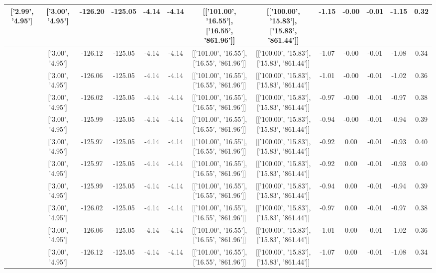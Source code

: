 \begin{table}[htbp]
\begin{adjustbox}{angle=90}
\begin{tabular}{|c|c|c|c|c|c|c|c|c|c|c|c|c|}
 ['2.99', '4.95'] & ['3.00', '4.95'] & -126.20 & -125.05 & -4.14 & -4.14 & [['101.00', '16.55'], ['16.55', '861.96']] & [['100.00', '15.83'], ['15.83', '861.44']] & -1.15 & -0.00 & -0.01 & -1.15 & 0.32\\ \hline
 ['2.99', '4.95'] & ['3.00', '4.95'] & -126.12 & -125.05 & -4.14 & -4.14 & [['101.00', '16.55'], ['16.55', '861.96']] & [['100.00', '15.83'], ['15.83', '861.44']] & -1.07 & -0.00 & -0.01 & -1.08 & 0.34\\ \hline
 ['3.00', '4.95'] & ['3.00', '4.95'] & -126.06 & -125.05 & -4.14 & -4.14 & [['101.00', '16.55'], ['16.55', '861.96']] & [['100.00', '15.83'], ['15.83', '861.44']] & -1.01 & -0.00 & -0.01 & -1.02 & 0.36\\ \hline
 ['3.00', '4.95'] & ['3.00', '4.95'] & -126.02 & -125.05 & -4.14 & -4.14 & [['101.00', '16.55'], ['16.55', '861.96']] & [['100.00', '15.83'], ['15.83', '861.44']] & -0.97 & -0.00 & -0.01 & -0.97 & 0.38\\ \hline
 ['3.00', '4.95'] & ['3.00', '4.95'] & -125.99 & -125.05 & -4.14 & -4.14 & [['101.00', '16.55'], ['16.55', '861.96']] & [['100.00', '15.83'], ['15.83', '861.44']] & -0.94 & -0.00 & -0.01 & -0.94 & 0.39\\ \hline
 ['3.00', '4.95'] & ['3.00', '4.95'] & -125.97 & -125.05 & -4.14 & -4.14 & [['101.00', '16.55'], ['16.55', '861.96']] & [['100.00', '15.83'], ['15.83', '861.44']] & -0.92 & 0.00 & -0.01 & -0.93 & 0.40\\ \hline
 ['3.00', '4.95'] & ['3.00', '4.95'] & -125.97 & -125.05 & -4.14 & -4.14 & [['101.00', '16.55'], ['16.55', '861.96']] & [['100.00', '15.83'], ['15.83', '861.44']] & -0.92 & 0.00 & -0.01 & -0.93 & 0.40\\ \hline
 ['3.00', '4.95'] & ['3.00', '4.95'] & -125.99 & -125.05 & -4.14 & -4.14 & [['101.00', '16.55'], ['16.55', '861.96']] & [['100.00', '15.83'], ['15.83', '861.44']] & -0.94 & 0.00 & -0.01 & -0.94 & 0.39\\ \hline
 ['3.00', '4.95'] & ['3.00', '4.95'] & -126.02 & -125.05 & -4.14 & -4.14 & [['101.00', '16.55'], ['16.55', '861.96']] & [['100.00', '15.83'], ['15.83', '861.44']] & -0.97 & 0.00 & -0.01 & -0.97 & 0.38\\ \hline
 ['3.00', '4.95'] & ['3.00', '4.95'] & -126.06 & -125.05 & -4.14 & -4.14 & [['101.00', '16.55'], ['16.55', '861.96']] & [['100.00', '15.83'], ['15.83', '861.44']] & -1.01 & 0.00 & -0.01 & -1.02 & 0.36\\ \hline
 ['3.01', '4.95'] & ['3.00', '4.95'] & -126.12 & -125.05 & -4.14 & -4.14 & [['101.00', '16.55'], ['16.55', '861.96']] & [['100.00', '15.83'], ['15.83', '861.44']] & -1.07 & 0.00 & -0.01 & -1.08 & 0.34\\ \hline

\end{tabular}
\end{adjustbox}
\end{table}
